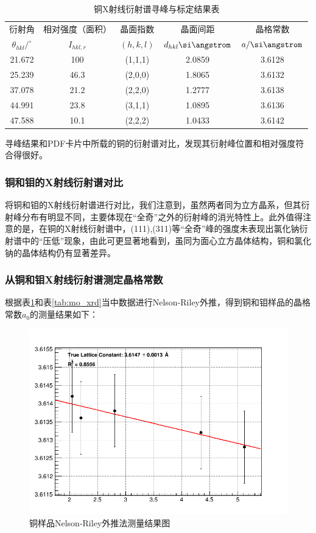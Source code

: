 \documentclass{thuemp}
\begin{document}
\begin{table}
    \centering
    \captionnamefont{\wuhao\bf\heiti}
    \captiontitlefont{\wuhao\bf\heiti}
    \caption{铜X射线衍射谱寻峰与标定结果表}
    \label{tab:cu_xrd}
    \liuhao
    \begin{tabular}{ccccc}
        \toprule
        衍射角 & 相对强度（面积）& 晶面指数 & 晶面间距 & 晶格常数 \\
        $\theta_{hkl}/^\circ$ & $I_{hkl,r}$ & $(h,k,l)$ & $d_{hkl}\text{\si\angstrom}$ & $a/\text{\si\angstrom}$\\
        \midrule
        21.672 &  100 & (1,1,1) & 2.0859 & 3.6128 \\
        25.239 & 46.3 & (2,0,0) & 1.8065 & 3.6132 \\
        37.078 & 21.2 & (2,2,0) & 1.2777 & 3.6138 \\
        44.991 & 23.8 & (3,1,1) & 1.0895 & 3.6136 \\
        47.588 & 10.1 & (2,2,2) & 1.0433 & 3.6142 \\
        \bottomrule
    \end{tabular}
\end{table}

寻峰结果和PDF卡片中所载的铜的衍射谱对比，发现其衍射峰位置和相对强度符合得很好。

\subsubsection{铜和钼的X射线衍射谱对比}

将铜和钼的X射线衍射谱进行对比，我们注意到，虽然两者同为立方晶系，但其衍射峰分布有明显不同，主要体现在“全奇”之外的衍射峰的消光特性上。此外值得注意的是，在铜的X射线衍射谱中，(111),(311)等“全奇”峰的强度未表现出氯化钠衍射谱中的“压低”现象，由此可更显著地看到，虽同为面心立方晶体结构，铜和氯化钠的晶体结构仍有显著差异。

\subsubsection{从铜和钼X射线衍射谱测定晶格常数}

根据表\ref{tab:cu_xrd}和表\ref{tab:mo_xrd}当中数据进行Nelson-Riley外推，得到铜和钼样品的晶格常数$a_0$的测量结果如下：

\begin{figure}[H]
    \centering
    \includegraphics[width=0.8\linewidth]{../Data/Fit_cu_xrd.png}
    \caption{铜样品Nelson-Riley外推法测量结果图}
    \label{fig:cu_xrd_extrapol}
\end{figure}
\end{document}

